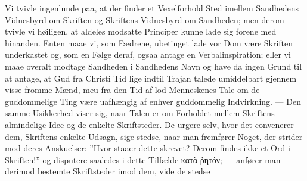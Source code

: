 \documentclass[12pt]{book}
\newcommand{\opage}[1]{\marginnote{\footnotesize\textit{[#1]}}}
\begin{document}
Vi tvivle ingenlunde paa, at der finder et Vexelforhold Sted imellem
Sandhedens Vidnesbyrd om Skriften og Skriftens Vidnesbyrd om Sandheden; men
derom tvivle vi høiligen, at aldeles modsatte Principer kunne lade sig forene
med hinanden. Enten maae vi, som Fædrene, ubetinget lade vor Dom være Skriften
underkastet og, som en Følge deraf, ogsaa antage en Verbalinspiration; eller
vi maae overalt modtage Sandheden i Sandhedens Navn og have da ingen Grund til
at antage, at Gud fra Christi Tid lige indtil Trajan talede
\opage{119} \setcounter{footnote}{0}%
umiddelbart gjennem visse fromme Mænd, meu fra den Tid af lod Menneskenes Tale
om de guddommelige Ting være uafhængig af enhver guddommelig Indvirkning. ---
Den samme Usikkerhed viser sig, naar Talen er om Forholdet mellem Skriftens
almindelige Idee og de enkelte Skriftsteder. De urgere selv, hvor det
convenerer dem, Skriftens enkelte Udsagn, sige stedse, naar man fremfører
Noget, der strider mod deres Anskuelser: ”Hvor staaer dette skrevet? Derom
findes ikke et Ord i Skriften!” og disputere saaledes i dette Tilfælde κατὰ
ῥητόν; --- anfører man derimod bestemte Skriftsteder imod dem, vide de stedse
\end{document}
